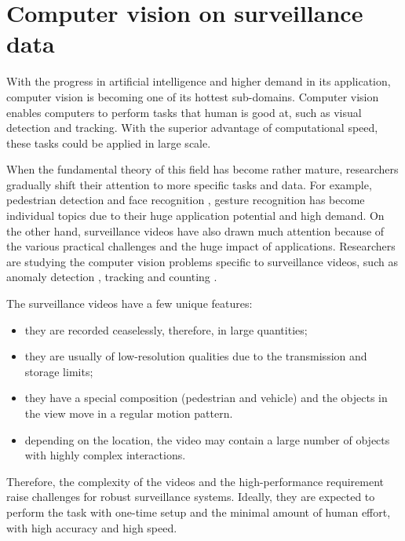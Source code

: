 \section{Computer vision on surveillance data}
\label{sec:intro-cv}

With the progress in artificial intelligence and higher demand in its application, computer vision is becoming one of its hottest sub-domains. 
Computer vision enables computers to perform tasks that human is good at, such as visual detection and tracking. 
With the superior advantage of computational speed, these tasks could be applied in large scale.

When the fundamental theory of this field has become rather mature, researchers gradually shift their attention to more specific tasks and data. For example, pedestrian detection \cite{dollar2012pedestrian} and face recognition \cite{parkhi2015deep}, gesture recognition \cite{rautaray2015vision} has become individual topics due to their huge application potential and high demand.
On the other hand, surveillance videos have also drawn much attention because of the various practical challenges and the huge impact of applications. 
Researchers are studying the computer vision problems specific to surveillance videos, such as anomaly detection \cite{scime2018anomaly}, tracking \cite{wu2015object} and counting \cite{seenouvong2016computer}. 


The surveillance videos have a few unique features: 
\begin{itemize}
\item they are recorded ceaselessly, therefore, in large quantities; 
\item they are usually of low-resolution qualities due to the transmission and storage limits;
\item they have a special composition (pedestrian and vehicle) and the objects in the view move in a regular motion pattern.
\item depending on the location, the video may contain a large number of objects with highly complex interactions.
\end{itemize}

Therefore, the complexity of the videos and the high-performance requirement raise challenges for robust surveillance systems. 
Ideally, they are expected to perform the task with one-time setup and the minimal amount of human effort, with high accuracy and high speed.